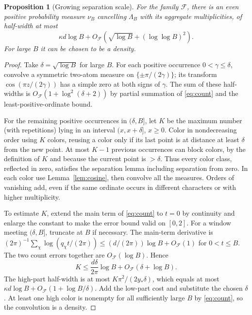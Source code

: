 \documentclass[11pt]{article}
\newtheorem{proposition}[theorem]{Proposition}
\theoremstyle{remark}\newtheorem{remark}[theorem]{Remark}
\newcommand{\F}{\mathcal F}\newcommand{\dd}{\mathrm d}
\begin{document}
\begin{proposition}[Growing separation scale]\label{prop:growing}
For the family $\F$, there is an even positive probability measure $\nu_B$ cancelling $\Lambda_B$ with its aggregate multiplicities, of half-width at most
\[
 \kappa d\log B+O_{\F}(\sqrt{\log B}+(\log\log B)^2).
\]
For large $B$ it can be chosen to be a density.
\end{proposition}
\begin{proof}
Take $\delta=\sqrt{\log B}$ for large $B$. For each positive occurrence $0<\gamma\le\delta$, convolve a symmetric two-atom measure on $\{\pm\pi/(2\gamma)\}$; its transform $\cos(\pi z/(2\gamma))$ has a simple zero at both signs of $\gamma$. The sum of these half-widths is $O_{\F}(1+\log^2(\delta+2))$ by partial summation of \eqref{eq:count} and the least-positive-ordinate bound.

For the remaining positive occurrences in $(\delta,B]$, let $K$ be the maximum number (with repetitions) lying in an interval $(x,x+\delta]$, $x\ge0$. Color in nondecreasing order using $K$ colors, reusing a color only if its last point is at distance at least $\delta$ from the new point. At most $K-1$ previous occurrences can block colors, by the definition of $K$ and because the current point is $>\delta$. Thus every color class, reflected in zero, satisfies the separation lemma including separation from zero. In each color use Lemma~\ref{lem:cosine}, then convolve all the measures. Orders of vanishing add, even if the same ordinate occurs in different characters or with higher multiplicity.

To estimate $K$, extend the main term of \eqref{eq:count} to $t=0$ by continuity and enlarge the constant to make the error bound valid on $[0,2]$. For a window meeting $(\delta,B]$, truncate at $B$ if necessary. The main-term derivative is $(2\pi)^{-1}\sum_\chi\log(q_\chi t/(2\pi))\le (d/(2\pi))\log B+O_{\F}(1)$ for $0<t\le B$. The two count errors together are $O_{\F}(\log B)$. Hence
\[
 K\le \frac{d\delta}{2\pi}\log B+O_{\F}(\delta+\log B).
\]
The high-part half-width is at most $K\pi^2/(2y_*\delta)$, which equals at most $\kappa d\log B+O_{\F}(1+\log B/\delta)$. Add the low-part cost and substitute the chosen $\delta$. At least one high color is nonempty for all sufficiently large $B$ by \eqref{eq:count}, so the convolution is a density.
\end{proof}
\end{document}

